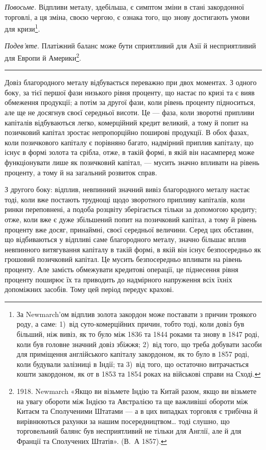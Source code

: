 
\emph{Повосьме.} Відпливи металу, здебільша, є симптом зміни в стані закордонної
торговлі, а ця зміна, своєю чергою, є ознака того, що знову достигають
умови для кризи\footnote{
За Newmarch’ом відплив золота закордон може поставати з причин троякого роду, а саме:
1)~від суто-комерційних причин, тобто тоді, коли довіз був більший, ніж вивіз, як то було між 1836
та 1844 роками та знову в 1847 роді, коли був головне значний довіз збіжжя; 2)~від того, що треба
добувати засоби для приміщення англійського капіталу закордоном, як то було в 1857 роді, коли
будували
залізниці в Індії; та 3)~від того, що остаточно витрачається кошти закордоном, як от в 1853
та 1854 роках на військові справи на Сході.
}.

\emph{Подев’яте.} Платіжний баланс може бути сприятливий для Азії й несприятливий
для Европи й Америки\footnote{
1918. Newmarch «Якщо ви візьмете Індію та Китай разом, якщо ви візьмете на увагу
обороти між Індією та Австралією та ще важливіші обороти між Китаєм та Сполученими Штатами — а в
цих випадках торговля є трибічна й вирівнюються рахунки за нашим посередництвом\dots{} тоді слушно,
що торговельний балянс був несприятливий не тільки для Англії, але й для Франції та Сполучених
Штатів». (В.~А 1857).
}.

\plainbreak{2}

Довіз благородного металу відбувається переважно при двох моментах.
З одного боку, за тієї першої фази низького рівня проценту, що настає по
кризі та є вияв обмеження продукції; а потім за другої фази, коли рівень проценту
підноситься, але ще не досягнув своєї середньої висоти. Це — фаза, коли
зворотні припливи капіталів відбуваються легко, комерційний кредит великий,
а тому й попит на позичковий капітал зростає непропорційно поширові продукції.
В обох фазах, коли позичкового капіталу є порівняно багато, надмірний
приплив капіталу, що існує в формі золота та срібла, отже, в такій формі,
в якій він насамперед може функціонувати лише як позичковий капітал, — мусить
значно впливати на рівень проценту, а тому й на загальний розвиток справ.

З другого боку: відплив, невпинний значний вивіз благородного металу
настає тоді, коли вже постають труднощі щодо зворотного припливу капіталів,
коли ринки переповнені, а подоба розцвіту зберігається тільки за допомогою
кредиту; отже, коли вже є дуже збільшений попит на позичковий капітал, а тому
й рівень проценту вже досяг, принаймні, своєї середньої величини. Серед цих
обставин, що відбиваються у відпливі саме благородного металу, значно більшає
вплив невпинного витягування капіталу в такій формі, в якій він існує безпосередньо
як грошовий позичковий капітал. Це мусить безпосередньо впливати
на рівень проценту. Але замість обмежувати кредитові операції, це піднесення
рівня проценту поширює їх та приводить до надмірного напруження всіх їхніх
допоміжних засобів. Тому цей період передує крахові.

